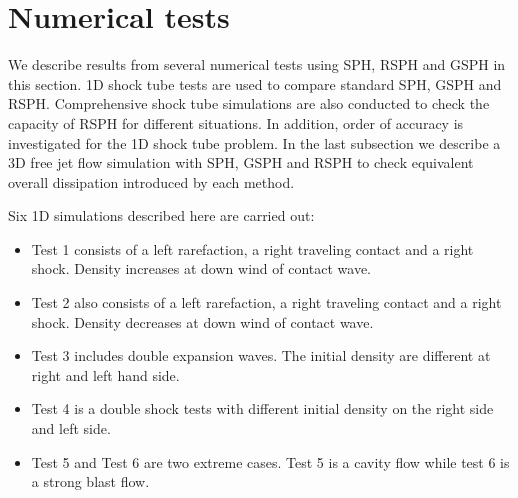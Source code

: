 \documentclass[review]{elsarticle}
\begin{document}
\section{Numerical tests} \label{numericaltests}
We describe results from several numerical tests using SPH, RSPH and GSPH in this section.
1D shock tube tests are used to compare standard SPH, GSPH and RSPH. Comprehensive shock tube simulations are also conducted to check the capacity of RSPH for different situations. In addition, order of accuracy is investigated for the 1D shock tube problem. 
In the last subsection we describe a 3D free jet flow simulation with SPH, GSPH and RSPH to check equivalent overall dissipation introduced by each method.

Six 1D simulations described here  are carried out:
\begin{itemize}%
\item Test 1 consists of a left rarefaction, a right traveling contact and a right shock. Density increases at down wind of contact wave. 
\item Test 2 also consists of a left rarefaction, a right traveling contact and a right shock. Density decreases at down wind of contact wave. 
\item Test 3 includes double expansion waves. The initial density are different at right and left hand side. 
\item Test 4 is a double shock tests with different initial density on the right side and left side.
\item Test 5 and Test 6 are two extreme cases. Test 5 is a cavity flow while test 6 is a strong blast flow.
\end{itemize}
\end{document}
